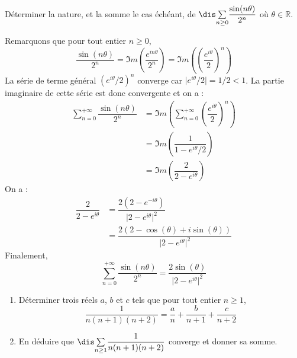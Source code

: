 \documentclass[a4paper,10pt]{report}
\newcommand{\Sum}[2]{\ensuremath{\textstyle{\sum\limits_{#1}^{#2}}}}
\begin{document}
\medskip

\begin{Exercice}{} Déterminer la nature, et la somme le cas échéant, de $\dis \Sum{n \geq 0}{} \dfrac{\sin(n \theta)}{2^n}$ où $\theta \in \mathbb{R}$.
\end{Exercice}

\corr Remarquons que pour tout entier $n \geq 0$,
$$ \dfrac{\sin(n \theta)}{2^n} = \Im m \left( \dfrac{e^{i n\theta}}{2^n} \right) = \Im m \left(\left( \dfrac{e^{i \theta}}{2} \right)^n \right)$$
La série de terme général $(e^{i \theta}/2)^n$ converge car $\vert e^{i \theta}/2 \vert = 1/2 <1$. La partie imaginaire de cette série est donc convergente et on a :
\begin{align*}
\sum_{n=0}^{+ \infty}  \dfrac{\sin(n \theta)}{2^n}  & = \Im m \left( \sum_{n=0}^{+ \infty} \left( \dfrac{e^{i \theta}}{2} \right)^n \right) \\
& = \Im m \left( \dfrac{1}{1-e^{i \theta}/2} \right) \\
& = \Im m \left( \dfrac{2}{2- e^{i \theta}} \right)
\end{align*}
On a :
\begin{align*}
\dfrac{2}{2- e^{i \theta}} & = \dfrac{2(2-e^{- i\theta})}{\vert 2- e^{i \theta} \vert^2} \\
& = \dfrac{2(2- \cos(\theta)+i \sin(\theta))}{\vert 2- e^{i \theta} \vert^2}
\end{align*}
Finalement,
$$ \sum_{n=0}^{+ \infty}  \dfrac{\sin(n \theta)}{2^n} = \dfrac{2\sin(\theta)}{\vert 2- e^{i \theta} \vert^2}$$

\medskip


\begin{Exercice}{} 
\begin{enumerate}
\item Déterminer trois réels $a$, $b$ et $c$ tels que pour tout entier $n \geq 1$,
$$ \frac{1}{n(n+1)(n+2)} = \frac{a}{n} + \frac{b}{n+1} + \frac{c}{n+2}$$
\item En déduire que $\dis \Sum{n \geq 1}{} \dfrac{1}{n(n+1)(n+2)}$ converge et donner sa somme.
\end{enumerate}
\end{Exercice}
\end{document}
